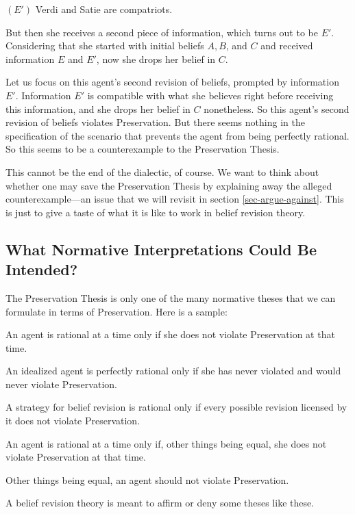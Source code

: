 	\xm $(E')$ Verdi and Satie are compatriots.

\ed But then she receives a second piece of information, which turns out to be $E'$. Considering that she started with initial beliefs $A, B$, and $C$ and received information $E$ and $E'$, now she drops her belief in $C$. 

\ed Let us focus on this agent's second revision of beliefs, prompted by information $E'$. Information $E'$ is compatible with what she believes right before receiving this information, and she drops her belief in $C$ nonetheless. So this agent's second revision of beliefs violates Preservation. But there seems nothing in the specification of the scenario that prevents the agent from being perfectly rational. So this seems to be a counterexample to the Preservation Thesis.

This cannot be the end of the dialectic, of course. We want to think about whether one may save the Preservation Thesis by explaining away the alleged counterexample---an issue that we will revisit in section \ref{sec-argue-against}. This is just to give a taste of what it is like to work in belief revision theory.



\subsection{What Normative Interpretations Could Be Intended?}\label{sec-interpretations}

The Preservation Thesis is only one of the many normative theses that we can formulate in terms of Preservation. Here is a sample:\op

	\xm\op
	\im[($T_1$)] An agent is rational at a time only if she does not violate Preservation at that time.

	\im[($T_2$)] An idealized agent is perfectly rational only if she has never violated and would never violate Preservation.

	\im[($T_3$)] A strategy for belief revision is rational only if every possible revision licensed by it does not violate Preservation. 

	\im[($T_4$)] An agent is rational at a time only if, other things being equal, she does not violate Preservation at that time.

	\im[($T_5$)] Other things being equal, an agent should not violate Preservation.
	\ed

\ed A belief revision theory is meant to affirm or deny some theses like these.

